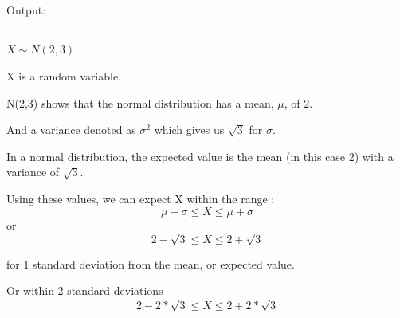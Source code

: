 \documentclass[a4paper]{article}
\begin{document}
\clearpage

\subsection{}


\clearpage

Output:



\subsection{}
$X \sim N(2,3)$

X is a random variable.

N(2,3) shows that the normal distribution has a mean, $\mu$, of 2.

And a variance denoted as $\sigma^{2}$ which gives us $\surd 3$ for $\sigma$.

In a normal distribution, the expected value is the mean (in this case 2) with a variance of $\surd 3$. 

Using these values, we can expect X within the range :
  \begin{equation}
  \mu - \sigma \leq X \leq \mu + \sigma
  \end{equation}
or
  \begin{equation}
  2 - \surd 3 \leq X \leq 2 + \surd 3
  \end{equation}

for 1 standard deviation from the mean, or expected value. 

Or within 2 standard deviations 
  \begin{equation}
  2 - 2 * \surd 3 \leq X \leq 2 + 2 * \surd 3
  \end{equation}
\end{document}
